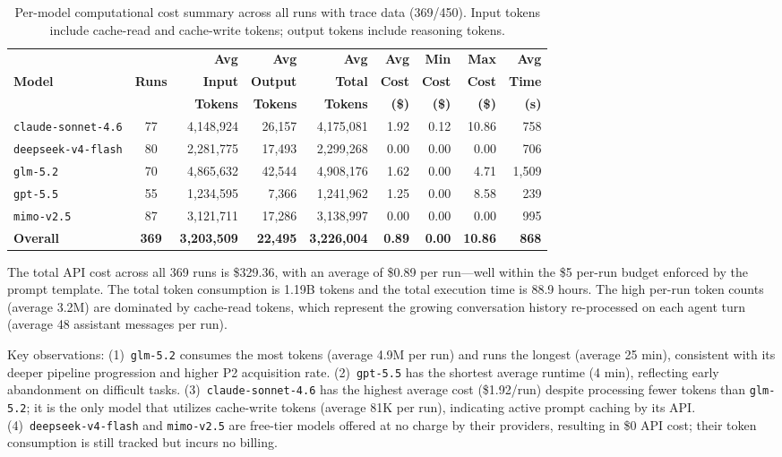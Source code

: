 \begin{table}[t]
\centering

\footnotesize
\renewcommand{\arraystretch}{1.1}
\setlength{\tabcolsep}{4pt}
\begin{tabular}{l c r r r r r r r}
\toprule
 & & \textbf{Avg} & \textbf{Avg} & \textbf{Avg} & \textbf{Avg} & \textbf{Min} & \textbf{Max} & \textbf{Avg} \\
\textbf{Model} & \textbf{Runs} & \textbf{Input} & \textbf{Output} & \textbf{Total} & \textbf{Cost} & \textbf{Cost} & \textbf{Cost} & \textbf{Time} \\
 & & \textbf{Tokens} & \textbf{Tokens} & \textbf{Tokens} & \textbf{(\$)} & \textbf{(\$)} & \textbf{(\$)} & \textbf{(s)} \\
\midrule
\texttt{claude-sonnet-4.6} & 77 & 4,148,924 & 26,157 & 4,175,081 & 1.92 & 0.12 & 10.86 & 758 \\
\texttt{deepseek-v4-flash} & 80 & 2,281,775 & 17,493 & 2,299,268 & 0.00 & 0.00 & 0.00 & 706 \\
\texttt{glm-5.2} & 70 & 4,865,632 & 42,544 & 4,908,176 & 1.62 & 0.00 & 4.71 & 1,509 \\
\texttt{gpt-5.5} & 55 & 1,234,595 & 7,366 & 1,241,962 & 1.25 & 0.00 & 8.58 & 239 \\
\texttt{mimo-v2.5} & 87 & 3,121,711 & 17,286 & 3,138,997 & 0.00 & 0.00 & 0.00 & 995 \\
\midrule
\textbf{Overall} & \textbf{369} & \textbf{3,203,509} & \textbf{22,495} & \textbf{3,226,004} & \textbf{0.89} & \textbf{0.00} & \textbf{10.86} & \textbf{868} \\
\bottomrule
\end{tabular}
\caption{Per-model computational cost summary across all runs with trace data (369/450). Input tokens include cache-read and cache-write tokens; output tokens include reasoning tokens.}
\label{tab:cost}
\end{table}

The total API cost across all 369 runs is \$329.36, with an average of \$0.89 per run---well within the \$5 per-run budget enforced by the prompt template. The total token consumption is 1.19B tokens and the total execution time is 88.9 hours. The high per-run token counts (average 3.2M) are dominated by cache-read tokens, which represent the growing conversation history re-processed on each agent turn (average 48 assistant messages per run).

Key observations: (1)~\texttt{glm-5.2} consumes the most tokens (average 4.9M per run) and runs the longest (average 25 min), consistent with its deeper pipeline progression and higher P2 acquisition rate. (2)~\texttt{gpt-5.5} has the shortest average runtime (4 min), reflecting early abandonment on difficult tasks. (3)~\texttt{claude-sonnet-4.6} has the highest average cost (\$1.92/run) despite processing fewer tokens than \texttt{glm-5.2}; it is the only model that utilizes cache-write tokens (average 81K per run), indicating active prompt caching by its API. (4)~\texttt{deepseek-v4-flash} and \texttt{mimo-v2.5} are free-tier models offered at no charge by their providers, resulting in \$0 API cost; their token consumption is still tracked but incurs no billing.
